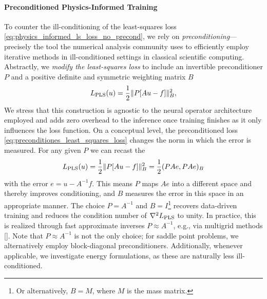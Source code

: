 \documentclass{article} %
\begin{document}
\paragraph{Preconditioned Physics-Informed Training}

To counter the ill-conditioning of the least-squares loss \eqref{eq:physics_informed_ls_loss_no_precond}, we rely on \emph{preconditioning}---precisely the tool the numerical analysis community uses to efficiently employ iterative methods in ill-conditioned settings in classical scientific computing. Abstractly, we \emph{modify the least-squares loss} to include an invertible preconditioner $P$ and a positive definite and symmetric weighting matrix $B$
\begin{equation}\label{eq:preconditiones_least_squares_loss}
   L_{\textup{PLS}}(u) = \frac12 \| P[Au - f] \|_B^2,
\end{equation}
We stress that this construction is agnostic to the neural operator architecture employed and adds zero overhead to the inference once training finishes as it only influences the loss function. On a conceptual level, the preconditioned loss \eqref{eq:preconditiones_least_squares_loss} changes the norm in which the error is measured. For any given $P$ we can recast the 
\begin{equation*}
   L_{\textup{PLS}}(u) 
   =
   \frac12 \| P[Au - f] \|_B^2 
   =
   \frac12(PAe, PAe)_B
\end{equation*}
with the error $e=u - A^{-1}f$. This means $P$ maps $Ae$ into a different space and thereby improves conditioning, and $B$ measures the error in this space in an appropriate manner. The choice $P=A^{-1}$ and $B=I$\footnote{Or alternatively, $B=M$, where $M$ is the mass matrix.} recovers data-driven training and reduces the condition number of $\nabla^2L_{\textup{PLS}}$ to unity. In practice, this is realized through fast approximate inverses $P\approx A^{-1}$, e.g., via multigrid methods []. Note that $P\approx A^{-1}$ is not the only choice; for saddle point problems, we alternatively employ block-diagonal preconditioners. Additionally, whenever applicable, we investigate energy formulations, as these are naturally less ill-conditioned.
\end{document}

